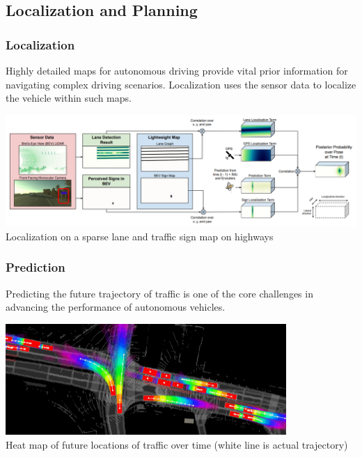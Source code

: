 
\subsection{Localization and Planning}

\begin{frame}
\frametitle{Localization}
Highly detailed maps for autonomous driving provide vital prior information
for navigating complex driving scenarios. Localization uses the sensor data
to localize the vehicle within such maps.
\begin{center}
\includegraphics[width=\textwidth]{images/uber_sparse_localization.png}\\
\footnotesize{Localization on a sparse lane and traffic sign map on highways \cite{Ma2019}}
\end{center}
\end{frame}

\begin{frame}
\frametitle{Prediction}
Predicting the future trajectory of traffic is one of the core challenges in
advancing the performance of autonomous vehicles.
\begin{center}
\includegraphics[width=0.8\textwidth]{images/uber_prediction.png}\\
\vspace{0.2cm}
\footnotesize{Heat map of future locations of traffic over time
      (white line is actual trajectory) \cite{Casas2020}}
\end{center}
\end{frame}

